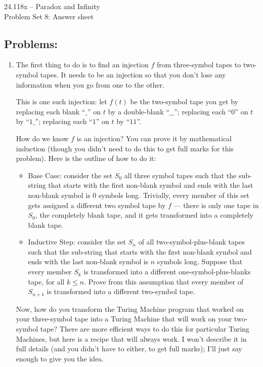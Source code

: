 \documentclass[12pt,a4paper]{article}
\begin{document}
\begin{center} {\large 24.118x -- Paradox and Infinity \\ \vspace{1mm}}
 {\large Problem Set 8: Answer sheet \\ \vspace{1mm}}
 
\end{center}
\vspace{3mm}


\subsection*{Problems:}


\begin{enumerate}
\item The first thing to do is to find an injection $f$ from three-symbol tapes to two-symbol tapes. It needs to be an injection so that you don't lose any information when you go from one to the other.

This is one such injection: let $f(t)$ be the two-symbol tape you get by replacing each blank ``$\_$'' on $t$ by a double-blank ``$\_\_$''; replacing each ``$0$'' on $t$ by ``$1\_$''; replacing each ``$1$'' on $t$ by ``$11$''.

How do we know $f$ is an injection? You can prove it by mathematical induction (though you didn't need to do this to get full marks for this problem). Here is the outline of how to do it:
\begin{itemize}
\item Base Case: consider the set $S_0$ all three symbol tapes such that the sub-string that starts with the first non-blank symbol and ends with the last non-blank symbol is 0 symbols long. Trivially, every member of this set gets assigned a different two symbol tape by $f$ --- there is only one tape in $S_0$, the completely blank tape, and it gets transformed into a completely blank tape.
\item Inductive Step: consider the set $S_n$ of all two-symbol-plus-blank tapes such that the sub-string that starts with the first non-blank symbol and ends with the last non-blank symbol is $n$ symbols long. Suppose that every member $S_k$ is transformed into a different one-symbol-plus-blanks tape, for all $k\le n$. Prove from this assumption that every member of $S_{n+1}$ is transformed into a different two-symbol tape.
\end{itemize}

Now, how do you transform the Turing Machine program that worked on your three-symbol tape into a Turing Machine that will work on your two-symbol tape? There are more efficient ways to do this for particular Turing Machines, but here is a recipe that will always work. I won't describe it in full details (and you didn't have to either, to get full marks); I'll just say enough to give you the idea.


\end{enumerate}
\end{document}
